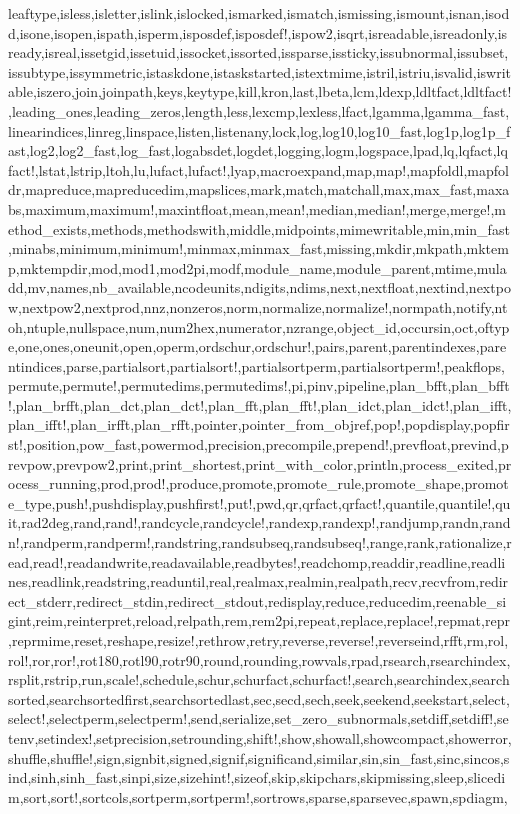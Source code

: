 {leaftype,isless,isletter,islink,islocked,ismarked,ismatch,ismissing,ismount,isnan,isodd,isone,isopen,ispath,isperm,isposdef,isposdef!,ispow2,isqrt,isreadable,isreadonly,isready,isreal,issetgid,issetuid,issocket,issorted,issparse,issticky,issubnormal,issubset,issubtype,issymmetric,istaskdone,istaskstarted,istextmime,istril,istriu,isvalid,iswritable,iszero,join,joinpath,keys,keytype,kill,kron,last,lbeta,lcm,ldexp,ldltfact,ldltfact!,leading_ones,leading_zeros,length,less,lexcmp,lexless,lfact,lgamma,lgamma_fast,linearindices,linreg,linspace,listen,listenany,lock,log,log10,log10_fast,log1p,log1p_fast,log2,log2_fast,log_fast,logabsdet,logdet,logging,logm,logspace,lpad,lq,lqfact,lqfact!,lstat,lstrip,ltoh,lu,lufact,lufact!,lyap,macroexpand,map,map!,mapfoldl,mapfoldr,mapreduce,mapreducedim,mapslices,mark,match,matchall,max,max_fast,maxabs,maximum,maximum!,maxintfloat,mean,mean!,median,median!,merge,merge!,method_exists,methods,methodswith,middle,midpoints,mimewritable,min,min_fast,minabs,minimum,minimum!,minmax,minmax_fast,missing,mkdir,mkpath,mktemp,mktempdir,mod,mod1,mod2pi,modf,module_name,module_parent,mtime,muladd,mv,names,nb_available,ncodeunits,ndigits,ndims,next,nextfloat,nextind,nextpow,nextpow2,nextprod,nnz,nonzeros,norm,normalize,normalize!,normpath,notify,ntoh,ntuple,nullspace,num,num2hex,numerator,nzrange,object_id,occursin,oct,oftype,one,ones,oneunit,open,operm,ordschur,ordschur!,pairs,parent,parentindexes,parentindices,parse,partialsort,partialsort!,partialsortperm,partialsortperm!,peakflops,permute,permute!,permutedims,permutedims!,pi,pinv,pipeline,plan_bfft,plan_bfft!,plan_brfft,plan_dct,plan_dct!,plan_fft,plan_fft!,plan_idct,plan_idct!,plan_ifft,plan_ifft!,plan_irfft,plan_rfft,pointer,pointer_from_objref,pop!,popdisplay,popfirst!,position,pow_fast,powermod,precision,precompile,prepend!,prevfloat,prevind,prevpow,prevpow2,print,print_shortest,print_with_color,println,process_exited,process_running,prod,prod!,produce,promote,promote_rule,promote_shape,promote_type,push!,pushdisplay,pushfirst!,put!,pwd,qr,qrfact,qrfact!,quantile,quantile!,quit,rad2deg,rand,rand!,randcycle,randcycle!,randexp,randexp!,randjump,randn,randn!,randperm,randperm!,randstring,randsubseq,randsubseq!,range,rank,rationalize,read,read!,readandwrite,readavailable,readbytes!,readchomp,readdir,readline,readlines,readlink,readstring,readuntil,real,realmax,realmin,realpath,recv,recvfrom,redirect_stderr,redirect_stdin,redirect_stdout,redisplay,reduce,reducedim,reenable_sigint,reim,reinterpret,reload,relpath,rem,rem2pi,repeat,replace,replace!,repmat,repr,reprmime,reset,reshape,resize!,rethrow,retry,reverse,reverse!,reverseind,rfft,rm,rol,rol!,ror,ror!,rot180,rotl90,rotr90,round,rounding,rowvals,rpad,rsearch,rsearchindex,rsplit,rstrip,run,scale!,schedule,schur,schurfact,schurfact!,search,searchindex,searchsorted,searchsortedfirst,searchsortedlast,sec,secd,sech,seek,seekend,seekstart,select,select!,selectperm,selectperm!,send,serialize,set_zero_subnormals,setdiff,setdiff!,setenv,setindex!,setprecision,setrounding,shift!,show,showall,showcompact,showerror,shuffle,shuffle!,sign,signbit,signed,signif,significand,similar,sin,sin_fast,sinc,sincos,sind,sinh,sinh_fast,sinpi,size,sizehint!,sizeof,skip,skipchars,skipmissing,sleep,slicedim,sort,sort!,sortcols,sortperm,sortperm!,sortrows,sparse,sparsevec,spawn,spdiagm,}
